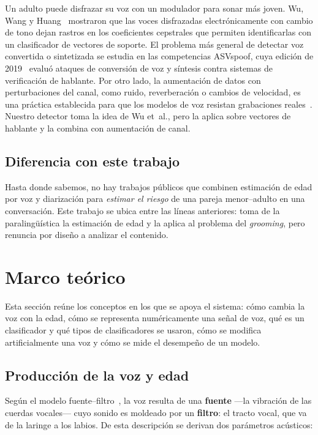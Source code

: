 \documentclass[11pt,a4paper]{article}
\newcommand{\gr}{\emph{grooming}}
\begin{document}
Un adulto puede disfrazar su voz con un modulador para sonar más joven. Wu, Wang y Huang~\cite{wu2014} mostraron que las voces disfrazadas electrónicamente con cambio de tono dejan rastros en los coeficientes cepstrales que permiten identificarlas con un clasificador de vectores de soporte. El problema más general de detectar voz convertida o sintetizada se estudia en las competencias ASVspoof, cuya edición de 2019~\cite{todisco2019} evaluó ataques de conversión de voz y síntesis contra sistemas de verificación de hablante. Por otro lado, la aumentación de datos con perturbaciones del canal, como ruido, reverberación o cambios de velocidad, es una práctica establecida para que los modelos de voz resistan grabaciones reales~\cite{ko2015}. Nuestro detector toma la idea de Wu et~al., pero la aplica sobre vectores de hablante y la combina con aumentación de canal.

\subsection{Diferencia con este trabajo}

Hasta donde sabemos, no hay trabajos públicos que combinen estimación de edad por voz y diarización para \emph{estimar el riesgo} de una pareja menor--adulto en una conversación. Este trabajo se ubica entre las líneas anteriores: toma de la paralingüística la estimación de edad y la aplica al problema del \gr{}, pero renuncia por diseño a analizar el contenido.

\section{Marco teórico}
\label{sec:marco}

Esta sección reúne los conceptos en los que se apoya el sistema: cómo cambia la voz con la edad, cómo se representa numéricamente una señal de voz, qué es un clasificador y qué tipos de clasificadores se usaron, cómo se modifica artificialmente una voz y cómo se mide el desempeño de un modelo.

\subsection{Producción de la voz y edad}

Según el modelo fuente--filtro~\cite{fant1960}, la voz resulta de una \textbf{fuente} ---la vibración de las cuerdas vocales--- cuyo sonido es moldeado por un \textbf{filtro}: el tracto vocal, que va de la laringe a los labios. De esta descripción se derivan dos parámetros acústicos:
\end{document}
